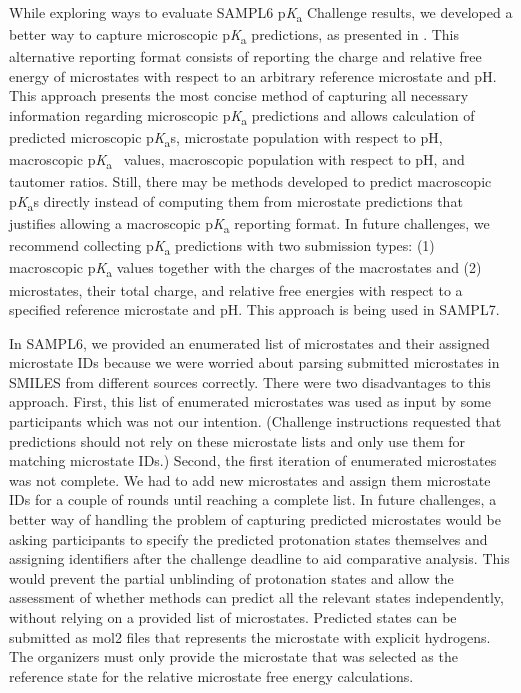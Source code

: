 \documentclass[9pt,lineno,final]{elife}
\newcommand{\pKa}{p\textit{K}\textsubscript{a}}
\begin{document}
While exploring ways to evaluate SAMPL6 \pKa{} Challenge results, we developed a better way to capture microscopic \pKa{} predictions, as presented in \citet{Gunner:2020:J.Comput.AidedMol.Des.}. 
This alternative reporting format consists of reporting the charge and relative free energy of microstates with respect to an arbitrary reference microstate and pH.
This approach presents the most concise method of capturing all necessary information regarding microscopic \pKa{} predictions and allows calculation of predicted microscopic \pKa{}s, microstate population with respect to pH, macroscopic \pKa{}~ values, macroscopic population with respect to pH, and tautomer ratios. 
Still, there may be methods developed to predict macroscopic \pKa{}s directly instead of computing them from microstate predictions that justifies allowing a macroscopic \pKa{} reporting format. 
In future challenges, we recommend collecting \pKa{} predictions with two submission types: (1) macroscopic \pKa{} values together with the charges of the macrostates and (2) microstates, their total charge, and relative free energies with respect to a specified reference microstate and pH. 
This approach is being used in SAMPL7.

In SAMPL6, we provided an enumerated list of microstates and their assigned microstate IDs because we were worried about parsing submitted microstates in SMILES from different sources correctly. 
There were two disadvantages to this approach. 
First, this list of enumerated microstates was used as input by some participants which was not our intention. (Challenge instructions requested that predictions should not rely on these microstate lists and only use them for matching microstate IDs.) 
Second, the first iteration of enumerated microstates was not complete. 
We had to add new microstates and assign them microstate IDs for a couple of rounds until reaching a complete list. 
In future challenges, a better way of handling the problem of capturing predicted microstates would be asking participants to specify the predicted protonation states themselves and assigning identifiers after the challenge deadline to aid comparative analysis. 
This would prevent the partial unblinding of protonation states and allow the assessment of whether methods can predict all the relevant states independently, without relying on a provided list of microstates.
Predicted states can be submitted as mol2 files that represents the microstate with explicit hydrogens. 
The organizers must only provide the microstate that was selected as the reference state for the relative microstate free energy calculations. 
\end{document}
